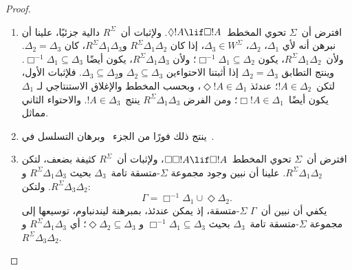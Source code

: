 \documentclass[../../../include/open-logic-section]{subfiles}
\begin{document}
\begin{proof}
  \begin{enumerate}
  \item افترض أن~$\Sigma$ تحوي المخطط~$\Diamond !A \lif \Box !A$.
    ولإثبات أن~$R^\Sigma$ دالية جزئيًا، علينا أن نبرهن أنه لأي
    $\Delta_1$، $\Delta_2$، $\Delta_3 \in W^\Sigma$، إذا كان
    $R^\Sigma \Delta_1\Delta_2$ و$R^\Sigma \Delta_1\Delta_3$، كان
    $\Delta_2 = \Delta_3$. ولأن~$R^\Sigma \Delta_1\Delta_2$، يكون
    $\Box^{-1}\Delta_1 \subseteq \Delta_2$؛ ولأن
    $R^\Sigma \Delta_1\Delta_3$، يكون أيضًا
    $\Box^{-1}\Delta_1 \subseteq \Delta_3$. وينتج التطابق
    $\Delta_2 = \Delta_3$ إذا أثبتنا الاحتواءين
    $\Delta_2 \subseteq \Delta_3$ و$\Delta_3 \subseteq \Delta_2$.
    فلإثبات الأول، لتكن~$!A \in \Delta_2$؛ عندئذ
    $\Diamond!A \in \Delta_1$، وبحسب المخطط والإغلاق الاستنتاجي لـ
    $\Delta_1$ يكون أيضًا~$\Box!A \in \Delta_1$؛ ومن الفرض
    $R^\Sigma \Delta_1\Delta_3$ ينتج~$!A \in \Delta_3$. والاحتواء
    الثاني مماثل.

  \item ينتج ذلك فورًا من الجزء~ وبرهان
    التسلسل في~.

  \item افترض أن~$\Sigma$ تحوي المخطط~$\Box\Box!A \lif \Box!A$،
    ولإثبات أن~$R^\Sigma$ كثيفة بضعف، لتكن
    $R^\Sigma \Delta_1\Delta_2$. علينا أن نبين وجود مجموعة
    $\Sigma$-متسقة تامة~$\Delta_3$ بحيث
    $R^\Sigma \Delta_1\Delta_3$ و$R^\Sigma \Delta_3\Delta_2$. ولتكن:
    \[
    \Gamma = \Box^{-1}\Delta_1 \cup \Diamond\Delta_2.
    \]
    يكفي أن نبين أن~$\Gamma$ $\Sigma$-متسقة، إذ يمكن عندئذ، بمبرهنة
    ليندنباوم، توسيعها إلى مجموعة $\Sigma$-متسقة تامة~$\Delta_3$ بحيث
    $\Box^{-1}\Delta_1 \subseteq \Delta_3$ و
    $\Diamond\Delta_2 \subseteq \Delta_3$؛ أي
    $R^\Sigma \Delta_1\Delta_3$ و
    $R^\Sigma \Delta_3\Delta_2$.


\end{enumerate}
\end{proof}
\end{document}
